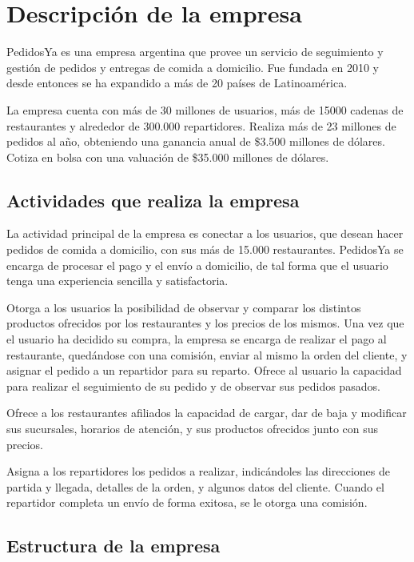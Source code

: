 \documentclass[11pt]{article}
\begin{document}
\newpage

\tableofcontents

\newpage
\section{Descripción de la empresa}
PedidosYa es una empresa argentina que provee un servicio de seguimiento y gestión de pedidos y entregas de comida a domicilio. Fue fundada en 2010 y desde entonces se ha expandido a más de 20 países de Latinoamérica.

La empresa cuenta con más de 30 millones de usuarios, más de 15000 cadenas de restaurantes y alrededor de 300.000 repartidores. Realiza más de 23 millones de pedidos al año, obteniendo una ganancia anual de \$3.500 millones de dólares. Cotiza en bolsa con una valuación de \$35.000 millones de dólares.

\subsection{Actividades que realiza la empresa}

La actividad principal de la empresa es conectar a los usuarios, que desean hacer pedidos de comida a domicilio, con sus más de 15.000 restaurantes. PedidosYa se encarga de procesar el pago y el envío a domicilio, de tal forma que el usuario tenga una experiencia sencilla y satisfactoria.

Otorga a los usuarios la posibilidad de observar y comparar los distintos productos ofrecidos por los restaurantes y los precios de los mismos. Una vez que el usuario ha decidido su compra, la empresa se encarga de realizar el pago al restaurante, quedándose con una comisión, enviar al mismo la orden del cliente, y asignar el pedido a un repartidor para su reparto. Ofrece al usuario la capacidad para realizar el seguimiento de su pedido y de observar sus pedidos pasados.

Ofrece a los restaurantes afiliados la capacidad de cargar, dar de baja y modificar sus sucursales, horarios de atención, y sus productos ofrecidos junto con sus precios.

Asigna a los repartidores los pedidos a realizar, indicándoles las direcciones de partida y llegada, detalles de la orden, y algunos datos del cliente. Cuando el repartidor completa un envío de forma exitosa, se le otorga una comisión.


\subsection{Estructura de la empresa}
\end{document}

